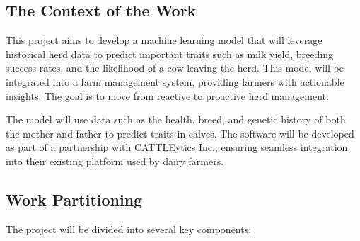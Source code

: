 \documentclass[12pt]{article}
\begin{document}
\subsection{The Context of the Work}
This project aims to develop a machine learning model that will leverage 
historical herd data to predict important traits such as milk yield, breeding 
success rates, and the likelihood of a cow leaving the herd. This model will be 
integrated into a farm management system, providing farmers with actionable 
insights. The goal is to move from reactive to proactive herd management.

The model will use data such as the health, breed, and genetic history of both 
the mother and father to predict traits in calves. The software will be 
developed as part of a partnership with CATTLEytics Inc., ensuring seamless 
integration into their existing platform used by dairy farmers.
\subsection{Work Partitioning}
The project will be divided into several key components:
\end{document}
